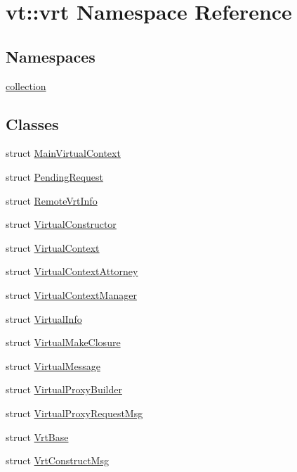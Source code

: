 \hypertarget{namespacevt_1_1vrt}{}\section{vt\+:\+:vrt Namespace Reference}
\label{namespacevt_1_1vrt}
\subsection*{Namespaces}
\begin{DoxyCompactItemize}
\item 
 \hyperlink{namespacevt_1_1vrt_1_1collection}{collection}
\end{DoxyCompactItemize}
\subsection*{Classes}
\begin{DoxyCompactItemize}
\item 
struct \hyperlink{structvt_1_1vrt_1_1_main_virtual_context}{Main\+Virtual\+Context}
\item 
struct \hyperlink{structvt_1_1vrt_1_1_pending_request}{Pending\+Request}
\item 
struct \hyperlink{structvt_1_1vrt_1_1_remote_vrt_info}{Remote\+Vrt\+Info}
\item 
struct \hyperlink{structvt_1_1vrt_1_1_virtual_constructor}{Virtual\+Constructor}
\item 
struct \hyperlink{structvt_1_1vrt_1_1_virtual_context}{Virtual\+Context}
\item 
struct \hyperlink{structvt_1_1vrt_1_1_virtual_context_attorney}{Virtual\+Context\+Attorney}
\item 
struct \hyperlink{structvt_1_1vrt_1_1_virtual_context_manager}{Virtual\+Context\+Manager}
\item 
struct \hyperlink{structvt_1_1vrt_1_1_virtual_info}{Virtual\+Info}
\item 
struct \hyperlink{structvt_1_1vrt_1_1_virtual_make_closure}{Virtual\+Make\+Closure}
\item 
struct \hyperlink{structvt_1_1vrt_1_1_virtual_message}{Virtual\+Message}
\item 
struct \hyperlink{structvt_1_1vrt_1_1_virtual_proxy_builder}{Virtual\+Proxy\+Builder}
\item 
struct \hyperlink{structvt_1_1vrt_1_1_virtual_proxy_request_msg}{Virtual\+Proxy\+Request\+Msg}
\item 
struct \hyperlink{structvt_1_1vrt_1_1_vrt_base}{Vrt\+Base}
\item 
struct \hyperlink{structvt_1_1vrt_1_1_vrt_construct_msg}{Vrt\+Construct\+Msg}
\end{DoxyCompactItemize}
